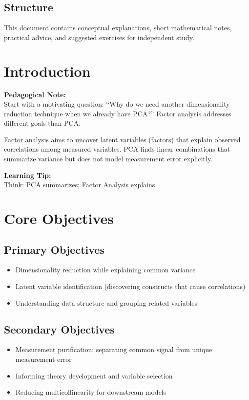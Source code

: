 \documentclass[a4paper,11pt]{tufte-book}
\newcommand{\noteTitle}[1]{\textcolor{tecblue}{\textbf{#1}}}
\newenvironment{pedagogicalnote}{%
  \begin{framed}
  \noindent\noteTitle{Pedagogical Note:}\\
}{%
  \end{framed}
}
\newenvironment{learningtip}{%
  \begin{framed}
  \noindent\noteTitle{Learning Tip:}\\
}{%
  \end{framed}
}
\begin{document}
\subsection{Structure}
This document contains conceptual explanations, short mathematical notes, practical advice, and suggested exercises for independent study.

\section{Introduction}

\begin{pedagogicalnote}
Start with a motivating question: ``Why do we need another dimensionality reduction technique when we already have PCA?'' Factor analysis addresses different goals than PCA.
\end{pedagogicalnote}

Factor analysis aims to uncover latent variables (factors) that explain observed correlations among measured variables. PCA finds linear combinations that summarize variance but does not model measurement error explicitly.

\begin{learningtip}
Think: PCA summarizes; Factor Analysis explains.
\end{learningtip}

\section{Core Objectives}

\subsection{Primary Objectives}
\begin{itemize}
  \item Dimensionality reduction while explaining common variance
  \item Latent variable identification (discovering constructs that cause correlations)
  \item Understanding data structure and grouping related variables
\end{itemize}

\subsection{Secondary Objectives}
\begin{itemize}
  \item Measurement purification: separating common signal from unique measurement error
  \item Informing theory development and variable selection
  \item Reducing multicollinearity for downstream models
\end{itemize}
\end{document}
